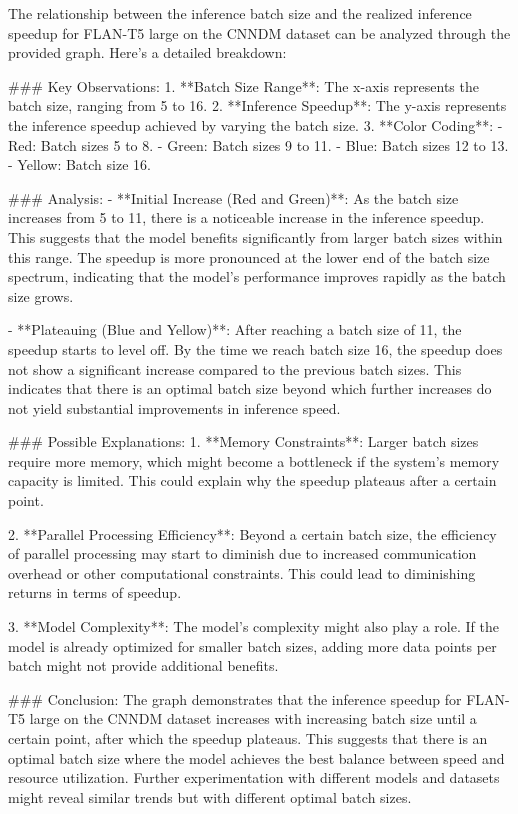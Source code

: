 The relationship between the inference batch size and the realized inference speedup for FLAN-T5 large on the CNNDM dataset can be analyzed through the provided graph. Here's a detailed breakdown:

### Key Observations:
1. **Batch Size Range**: The x-axis represents the batch size, ranging from 5 to 16.
2. **Inference Speedup**: The y-axis represents the inference speedup achieved by varying the batch size.
3. **Color Coding**:
   - Red: Batch sizes 5 to 8.
   - Green: Batch sizes 9 to 11.
   - Blue: Batch sizes 12 to 13.
   - Yellow: Batch size 16.

### Analysis:
- **Initial Increase (Red and Green)**: As the batch size increases from 5 to 11, there is a noticeable increase in the inference speedup. This suggests that the model benefits significantly from larger batch sizes within this range. The speedup is more pronounced at the lower end of the batch size spectrum, indicating that the model's performance improves rapidly as the batch size grows.
  
- **Plateauing (Blue and Yellow)**: After reaching a batch size of 11, the speedup starts to level off. By the time we reach batch size 16, the speedup does not show a significant increase compared to the previous batch sizes. This indicates that there is an optimal batch size beyond which further increases do not yield substantial improvements in inference speed.

### Possible Explanations:
1. **Memory Constraints**: Larger batch sizes require more memory, which might become a bottleneck if the system's memory capacity is limited. This could explain why the speedup plateaus after a certain point.
   
2. **Parallel Processing Efficiency**: Beyond a certain batch size, the efficiency of parallel processing may start to diminish due to increased communication overhead or other computational constraints. This could lead to diminishing returns in terms of speedup.

3. **Model Complexity**: The model's complexity might also play a role. If the model is already optimized for smaller batch sizes, adding more data points per batch might not provide additional benefits.

### Conclusion:
The graph demonstrates that the inference speedup for FLAN-T5 large on the CNNDM dataset increases with increasing batch size until a certain point, after which the speedup plateaus. This suggests that there is an optimal batch size where the model achieves the best balance between speed and resource utilization. Further experimentation with different models and datasets might reveal similar trends but with different optimal batch sizes.